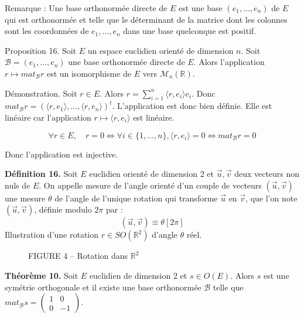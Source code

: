 Remarque : Une base orthonormée directe de $E$ est une base $(e_1, \dots, e_n)$ de $E$ qui est orthonormée et telle que le déterminant de la matrice dont les colonnes sont les coordonnées de $e_1, \dots, e_n$ dans une base quelconque est positif.

Proposition 16. Soit $E$ un espace euclidien orienté de dimension $n$. Soit $\mathcal{B} = (e_1, \dots, e_n)$ une base orthonormée directe de $E$. Alors l'application $r \mapsto mat_{\mathcal{B}} r$ est un isomorphisme de $E$ vers $\mathcal{M}_n(\mathbb{R})$.

Démonstration. Soit $r \in E$. Alors $r = \sum_{i=1}^n \langle r, e_i \rangle e_i$. Donc $mat_{\mathcal{B}} r = (\langle r, e_1 \rangle, \dots, \langle r, e_n \rangle)^t$. L'application est donc bien définie. Elle est linéaire car l'application $r \mapsto \langle r, e_i \rangle$ est linéaire.

\[
\forall r \in E, \quad r = 0 \Leftrightarrow \forall i \in \{1, \dots, n\}, \langle r, e_i \rangle = 0 \Leftrightarrow mat_{\mathcal{B}} r = 0
\]

Donc l'application est injective.


\textbf{Définition 16.} Soit $E$ euclidien orienté de dimension 2 et $\vec{u}, \vec{v}$ deux vecteurs non nuls de $E$.
On appelle mesure de l'angle orienté d'un couple de vecteurs $(\vec{u}, \vec{v})$ une mesure $\theta$ de l'angle
de l'unique rotation qui transforme $\vec{u}$ en $\vec{v}$, que l'on note $(\vec{u}, \vec{v})$, définie modulo $2\pi$
par :
\[ (\vec{u}, \vec{v}) \equiv \theta [2\pi] \]
Illustration d'une rotation $r \in SO(\mathbb{R}^2)$ d'angle
$\theta$ réel.

\begin{figure}[H]
\centering
{}
\caption{FIGURE 4 – Rotation dans $\mathbb{R}^2$}
\end{figure}

\textbf{Théorème 10.} Soit $E$ euclidien de dimension 2 et $s \in O(E)$. Alors $s$ est une symétrie
orthogonale et il existe une base orthonormée $\mathcal{B}$ telle que $mat_{\mathcal{B}} s = \begin{pmatrix} 1 & 0 \\ 0 & -1 \end{pmatrix}$.

